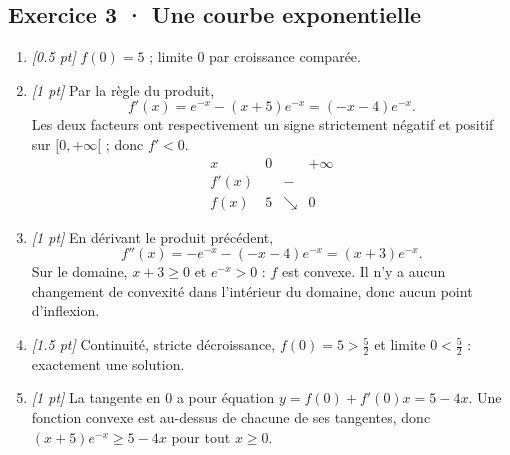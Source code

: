\subsection*{Exercice 3 · Une courbe exponentielle}\begin{enumerate}

\item \textit{[\num{0,5} pt]} $f(0)=5$ ; limite $0$ par croissance comparée.

\item \textit{[1 pt]} Par la règle du produit,
\[f'(x)=e^{-x}-(x+5)e^{-x}=(-x-4)e^{-x}.\]
Les deux facteurs ont respectivement un signe strictement négatif et positif sur $[0,+\infty[$ ; donc $f'<0$.
\[\begin{array}{c|ccc}x&0&&+\infty\\\hline f'(x)&&-&\\\hline f(x)&5&\searrow&0\end{array}\]

\item \textit{[1 pt]} En dérivant le produit précédent,
\[f''(x)=-e^{-x}-(-x-4)e^{-x}=(x+3)e^{-x}.\]
Sur le domaine, $x+3\ge0$ et $e^{-x}>0$ : $f$ est convexe. Il n'y a aucun changement de convexité dans l'intérieur du domaine, donc aucun point d'inflexion.

\item \textit{[\num{1,5} pt]} Continuité, stricte décroissance, $f(0)=5>\frac{5}{2}$ et limite $0<\frac{5}{2}$ : exactement une solution.

\item \textit{[1 pt]} La tangente en $0$ a pour équation $y=f(0)+f'(0)x=5-4x$. Une fonction convexe est au-dessus de chacune de ses tangentes, donc $(x+5)e^{-x}\ge 5-4x$ pour tout $x\ge0$.

\end{enumerate}

